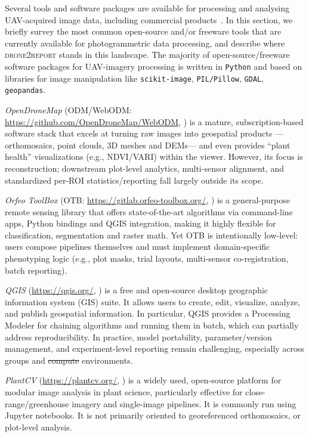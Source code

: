 \documentclass[drones,technicalnote,accept,pdftex,moreauthors]{Definitions/mdpi}
\providecommand{\DIFadd}[1]{{\protect\color{blue}\uwave{#1}}} %
\providecommand{\DIFdel}[1]{{\protect\color{red}\sout{#1}}}                      %
\providecommand{\DIFaddbegin}{} %
\providecommand{\DIFaddend}{} %
\providecommand{\DIFdelbegin}{} %
\providecommand{\DIFdelend}{} %
\newcommand{\DIFscaledelfig}{0.5}
\newlength{\DIFdelgraphicswidth} %
\newlength{\DIFdelgraphicsheight} %
\newcommand{\DIFaddincludegraphics}[2][]{{\color{blue}\fbox{\DIFOincludegraphics[#1]{#2}}}} %
\newcommand{\DIFdelincludegraphics}[2][]{%
\sbox{\DIFdelgraphicsbox}{\DIFOincludegraphics[#1]{#2}}%
\settoboxwidth{\DIFdelgraphicswidth}{\DIFdelgraphicsbox} %
\settoboxtotalheight{\DIFdelgraphicsheight}{\DIFdelgraphicsbox} %
\scalebox{\DIFscaledelfig}{%
\parbox[b]{\DIFdelgraphicswidth}{\usebox{\DIFdelgraphicsbox}\\[-\baselineskip] \rule{\DIFdelgraphicswidth}{0em}}\llap{\resizebox{\DIFdelgraphicswidth}{\DIFdelgraphicsheight}{%
\setlength{\unitlength}{\DIFdelgraphicswidth}%
\begin{picture}(1,1)%
\thicklines\linethickness{2pt} %
{\color[rgb]{1,0,0}\put(0,0){\framebox(1,1){}}}%
{\color[rgb]{1,0,0}\put(0,0){\line( 1,1){1}}}%
{\color[rgb]{1,0,0}\put(0,1){\line(1,-1){1}}}%
\end{picture}%
}\hspace*{3pt}}} %
} %
\DeclareRobustCommand{\DIFaddbegin}{\DIFOaddbegin \let\includegraphics\DIFaddincludegraphics} %
\DeclareRobustCommand{\DIFaddend}{\DIFOaddend \let\includegraphics\DIFOincludegraphics} %
\DeclareRobustCommand{\DIFdelbegin}{\DIFOdelbegin \let\includegraphics\DIFdelincludegraphics} %
\DeclareRobustCommand{\DIFdelend}{\DIFOaddend \let\includegraphics\DIFOincludegraphics} %
\begin{document}
Several tools and software packages are available for processing and analysing UAV-acquired image data, including commercial products~\cite{sharma2021development}. 
In this section, we briefly survey the most common open-source and/or freeware tools that are currently available for photogrammetric data processing, and describe where \textsc{drone2report} stands in this landscape. 
The majority of open-source/freeware software packages for UAV-imagery processing is written in \texttt{Python} and based on libraries for image manipulation like \texttt{scikit-image}, \texttt{PIL/Pillow}, \texttt{GDAL}, \texttt{geopandas}.

\textit{OpenDroneMap} (ODM/WebODM: \url{https://github.com/OpenDroneMap/WebODM}, \cite{vacca2020web}) is a mature, subscription-based software stack that excels at turning raw images into geospatial products —orthomosaics, point clouds, 3D meshes and DEMs— and even provides “plant health” visualizations (e.g., NDVI/VARI) within the viewer. However, its focus is reconstruction; downstream plot-level analytics, multi-sensor alignment, and standardized per-ROI statistics/reporting fall largely outside its scope.

\textit{Orfeo ToolBox} (OTB: \url{https://gitlab.orfeo-toolbox.org/}, \cite{noauthor_orfeo_nodate, grizonnet_orfeo_2017}) is a general-purpose remote sensing library that offers state-of-the-art algorithms via command-line apps, Python bindings and QGIS integration, making it highly flexible for classification, segmentation and raster math. Yet OTB is intentionally low-level: users compose pipelines themselves and must implement domain-specific phenotyping logic (e.g., plot masks, trial layouts, multi-sensor co-registration, batch reporting). 

\textit{QGIS} (\url{https://qgis.org/}, \cite{moyroud2018introduction}) is a free and open-source desktop geographic information system (GIS) suite. It allows users to create, edit, visualize, analyze, and publish geospatial information. In particular, QGIS provides a Processing Modeler \cite{dobesova2020evaluation} for chaining algorithms and running them in batch, which can partially address reproducibility. In practice, model portability, parameter/version management, and experiment-level reporting remain challenging, especially across groups and \DIFdelbegin \DIFdel{compute }\DIFdelend \DIFaddbegin \DIFadd{computer }\DIFaddend environments.

\textit{PlantCV} (\url{https://plantcv.org/}, \cite{noauthor_plantcv_2021}) is a widely used, open-source platform for modular image analysis in plant science, particularly effective for close-range/greenhouse imagery and single-image pipelines. It is commonly run using Jupyter notebooks. It is not primarily oriented to georeferenced orthomosaics,  or plot-level analysis.
\end{document}
